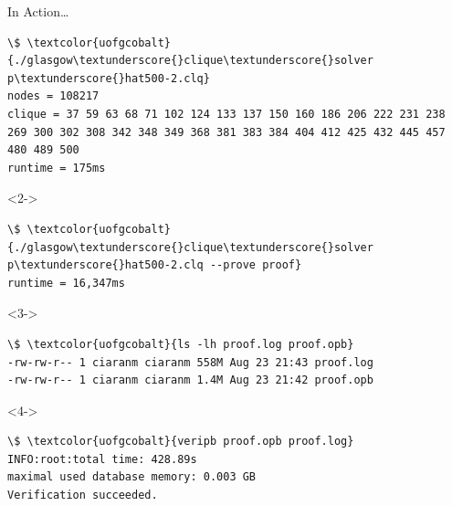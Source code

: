 \documentclass{beamer}
\begin{document}
\begin{frame}[t,fragile]{In Action\ldots}
\small\begin{Verbatim}[commandchars=\\\{\},codes={\catcode`$=3\catcode`^=7}]
\$ \textcolor{uofgcobalt}{./glasgow\textunderscore{}clique\textunderscore{}solver p\textunderscore{}hat500-2.clq}
nodes = 108217
clique = 37 59 63 68 71 102 124 133 137 150 160 186 206 222 231 238 269 300 302 308 342 348 349 368 381 383 384 404 412 425 432 445 457 480 489 500
runtime = 175ms
\end{Verbatim}

\begin{onlyenv}<2->\small\begin{Verbatim}[commandchars=\\\{\},codes={\catcode`$=3\catcode`^=7}]
\$ \textcolor{uofgcobalt}{./glasgow\textunderscore{}clique\textunderscore{}solver p\textunderscore{}hat500-2.clq --prove proof}
runtime = 16,347ms
\end{Verbatim}
\end{onlyenv}

\begin{onlyenv}<3->\small\begin{Verbatim}[commandchars=\\\{\},codes={\catcode`$=3\catcode`^=7}]
\$ \textcolor{uofgcobalt}{ls -lh proof.log proof.opb}
-rw-rw-r-- 1 ciaranm ciaranm 558M Aug 23 21:43 proof.log
-rw-rw-r-- 1 ciaranm ciaranm 1.4M Aug 23 21:42 proof.opb
\end{Verbatim}
\end{onlyenv}

\begin{onlyenv}<4->\small\begin{Verbatim}[commandchars=\\\{\},codes={\catcode`$=3\catcode`^=7}]
\$ \textcolor{uofgcobalt}{veripb proof.opb proof.log}
INFO:root:total time: 428.89s
maximal used database memory: 0.003 GB
Verification succeeded.
\end{Verbatim}
\end{onlyenv}
\end{frame}
\end{document}
